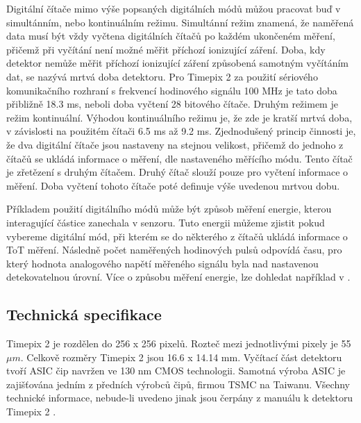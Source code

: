 \par Digitální čítače mimo výše popsaných digitálních módů můžou pracovat buď v simultánním, nebo kontinuálním režimu. Simultánní režim znamená, že naměřená data musí být vždy vyčtena digitálních čítačů po každém ukončeném měření, přičemž při vyčítání není možné měřit příchozí ionizující záření. Doba, kdy detektor nemůže měřit příchozí ionizující záření způsobená samotným vyčítáním dat, se nazývá mrtvá doba detektoru. Pro Timepix 2 za použití sériového komunikačního rozhraní s frekvencí hodinového signálu 100 MHz je tato doba přibližně 18.3 ms, neboli doba vyčtení 28 bitového čítače. Druhým režimem je režim kontinuální. Výhodou kontinuálního režimu je, že zde je kratší mrtvá doba, v závislosti na použitém čítači 6.5 ms až 9.2 ms. Zjednodušený princip činnosti je, že dva digitální čítače jsou nastaveny na stejnou velikost, přičemž do jednoho z čítačů se ukládá informace o měření, dle nastaveného měřícího módu. Tento čítač je zřetězení s druhým čítačem. Druhý čítač slouží pouze pro vyčtení informace o měření. Doba vyčtení tohoto čítače poté definuje výše uvedenou mrtvou dobu.
\par Příkladem použití digitálního módů může být způsob měření energie, kterou interagující částice zanechala v senzoru. Tuto energii můžeme zjistit pokud vybereme digitální mód, při kterém se do některého z čítačů ukládá informace o ToT měření. Následně počet naměřených hodinových pulsů odpovídá času, pro který hodnota analogového napětí měřeného signálu byla nad nastavenou detekovatelnou úrovní. Více o způsobu měření energie, lze dohledat například v \cite{JAKUBEK2011S262}.

\subsection{Technická specifikace} %
\label{Technicka specifikace}
Timepix 2 je rozdělen do 256 x 256 pixelů. Rozteč mezi jednotlivými pixely je 55 $\mu$$m$. Celkově rozměry Timepix 2 jsou 16.6 x 14.14 mm. Vyčítací část detektoru tvoří ASIC čip navržen ve 130 nm CMOS technologii. Samotná výroba ASIC je zajišťována jedním z předních výrobců čipů, firmou TSMC \cite{TSMC} na Taiwanu. Všechny technické informace, nebude-li uvedeno jinak jsou čerpány z manuálu k detektoru Timepix 2 \cite{tpx2_manual}.

